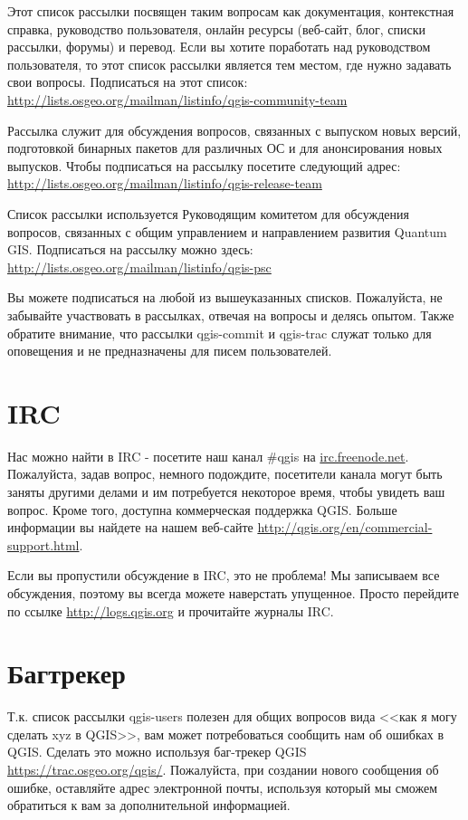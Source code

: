 Этот список рассылки посвящен таким вопросам как документация,
контекстная справка, руководство пользователя, онлайн ресурсы (веб-сайт,
блог, списки рассылки, форумы) и перевод. Если вы хотите поработать над
руководством пользователя, то этот список рассылки является тем местом,
где нужно задавать свои вопросы. Подписаться на этот список: \\
\url{http://lists.osgeo.org/mailman/listinfo/qgis-community-team}

Рассылка служит для обсуждения  вопросов, связанных с выпуском новых
версий, подготовкой бинарных пакетов для различных ОС и для
анонсирования новых выпусков. Чтобы подписаться на рассылку посетите
следующий адрес:\\
\url{http://lists.osgeo.org/mailman/listinfo/qgis-release-team}

Список рассылки используется Руководящим комитетом для обсуждения
вопросов, связанных с общим управлением и направлением развития Quantum
GIS. Подписаться на рассылку можно здесь:\\
\url{http://lists.osgeo.org/mailman/listinfo/qgis-psc}

Вы можете подписаться на любой из вышеуказанных списков. Пожалуйста, не
забывайте участвовать в рассылках, отвечая на вопросы и делясь опытом.
Также обратите внимание, что рассылки qgis-commit и qgis-trac служат
только для оповещения и не предназначены для писем пользователей.

\section{IRC}
Нас можно найти в IRC - посетите наш канал \#qgis на
\url{irc.freenode.net}. Пожалуйста, задав вопрос, немного подождите,
посетители канала могут быть заняты другими делами и им потребуется
некоторое время, чтобы увидеть ваш вопрос. Кроме того, доступна
коммерческая поддержка QGIS. Больше информации вы найдете на нашем
веб-сайте \url{http://qgis.org/en/commercial-support.html}.

Если вы пропустили обсуждение в IRC, это не проблема! Мы записываем все
обсуждения, поэтому вы всегда можете наверстать упущенное. Просто
перейдите по ссылке \url{http://logs.qgis.org} и прочитайте журналы IRC.

\section{Багтрекер}
Т.к. список рассылки qgis-users полезен для общих вопросов вида <<как я
могу сделать xyz в QGIS>>, вам может потребоваться сообщить нам об
ошибках в QGIS. Сделать это можно используя баг-трекер QGIS
\url{https://trac.osgeo.org/qgis/}. Пожалуйста, при создании нового
сообщения об ошибке, оставляйте адрес электронной почты, используя
который мы сможем обратиться к вам за дополнительной информацией.

